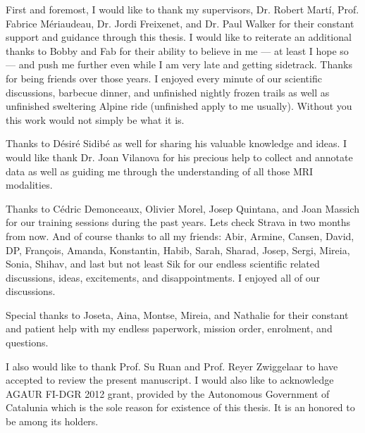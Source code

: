 

\begin{acknowledgements}      %
First and foremost, I would like to thank my supervisors, Dr. Robert Mart\'i, Prof. Fabrice M\'eriaudeau, Dr. Jordi Freixenet, and Dr. Paul Walker for their constant support and guidance through this thesis.
I would like to reiterate an additional thanks to Bobby and Fab for their ability to believe in me --- at least I hope so --- and push me further even while I am very late and getting sidetrack.
Thanks for being friends over those years.
I enjoyed every minute of our scientific discussions, barbecue dinner, and unfinished nightly frozen trails as well as unfinished sweltering Alpine ride (unfinished apply to me usually).
Without you this work would not simply be what it is. 

Thanks to D\'esir\'e Sidib\'e as well for sharing his valuable knowledge and ideas.
I would like thank Dr. Joan Vilanova for his precious help to collect and annotate data as well as guiding me through the understanding of all those MRI modalities.

Thanks to C\'edric Demonceaux, Olivier Morel, Josep Quintana, and Joan Massich for our training sessions during the past years.
Lets check Strava in two months from now.
And of course thanks to all my friends: Abir, Armine, Cansen, David, DP, Fran\c{c}ois, Amanda, Konstantin, Habib, Sarah, Sharad, Josep, Sergi, Mireia, Sonia, Shihav, and last but not least Sik for our endless scientific related discussions, ideas, excitements, and disappointments.
I enjoyed all of our discussions.

Special thanks to Joseta, Aina, Montse, Mireia, and Nathalie for their constant and patient help with my endless paperwork, mission order, enrolment, and questions.

I also would like to thank Prof. Su Ruan and Prof. Reyer Zwiggelaar to have accepted to review the present manuscript.
I would also like to acknowledge AGAUR FI-DGR 2012 grant, provided by the Autonomous Government of Catalunia which is the sole reason for existence of this thesis.
It is an honored to be among its holders.


\end{acknowledgements}
